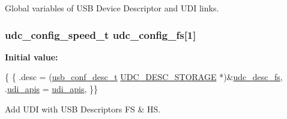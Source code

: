 Global variables of U\-S\-B Device Descriptor and U\-D\-I links. \hypertarget{group__udi__cdc__group__single__desc_ga5db6d631eea81d0c57ac6fde3a4963a1}{
\subsubsection[{udc\-\_\-config\-\_\-fs}]{ {\bf udc\-\_\-config\-\_\-speed\-\_\-t} udc\-\_\-config\-\_\-fs\mbox{[}1\mbox{]}}}\label{group__udi__cdc__group__single__desc_ga5db6d631eea81d0c57ac6fde3a4963a1}
{\bfseries Initial value\-:}
\begin{DoxyCode}
 \{ \{
        .desc          = (\hyperlink{structusb__conf__desc__t}{usb\_conf\_desc\_t} \hyperlink{group__udc__desc__group_gae086959cec07a2e71ab069e25a51764f}{UDC\_DESC\_STORAGE}
      *)&\hyperlink{group__udi__cdc__group__single__desc_ga694cd2202d59a342c2ed2e50f427a932}{udc\_desc\_fs},
        .\hyperlink{group__udi__cdc__group__single__desc_ga5356b021bc068e4b564577e38b44ba0e}{udi\_apis} = \hyperlink{group__udi__cdc__group__single__desc_ga5356b021bc068e4b564577e38b44ba0e}{udi\_apis},
\}\}
\end{DoxyCode}


Add U\-D\-I with U\-S\-B Descriptors F\-S \& H\-S. 

